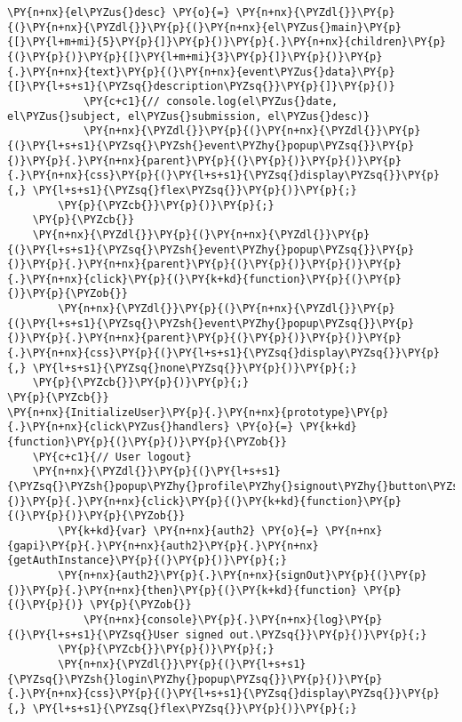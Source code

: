 \begin{Verbatim}[commandchars=\\\{\}]
            \PY{n+nx}{el\PYZus{}desc} \PY{o}{=} \PY{n+nx}{\PYZdl{}}\PY{p}{(}\PY{n+nx}{\PYZdl{}}\PY{p}{(}\PY{n+nx}{el\PYZus{}main}\PY{p}{[}\PY{l+m+mi}{5}\PY{p}{]}\PY{p}{)}\PY{p}{.}\PY{n+nx}{children}\PY{p}{(}\PY{p}{)}\PY{p}{[}\PY{l+m+mi}{3}\PY{p}{]}\PY{p}{)}\PY{p}{.}\PY{n+nx}{text}\PY{p}{(}\PY{n+nx}{event\PYZus{}data}\PY{p}{[}\PY{l+s+s1}{\PYZsq{}description\PYZsq{}}\PY{p}{]}\PY{p}{)}
            \PY{c+c1}{// console.log(el\PYZus{}date, el\PYZus{}subject, el\PYZus{}submission, el\PYZus{}desc)}
            \PY{n+nx}{\PYZdl{}}\PY{p}{(}\PY{n+nx}{\PYZdl{}}\PY{p}{(}\PY{l+s+s1}{\PYZsq{}\PYZsh{}event\PYZhy{}popup\PYZsq{}}\PY{p}{)}\PY{p}{.}\PY{n+nx}{parent}\PY{p}{(}\PY{p}{)}\PY{p}{)}\PY{p}{.}\PY{n+nx}{css}\PY{p}{(}\PY{l+s+s1}{\PYZsq{}display\PYZsq{}}\PY{p}{,} \PY{l+s+s1}{\PYZsq{}flex\PYZsq{}}\PY{p}{)}\PY{p}{;}
        \PY{p}{\PYZcb{}}\PY{p}{)}\PY{p}{;}
    \PY{p}{\PYZcb{}}
    \PY{n+nx}{\PYZdl{}}\PY{p}{(}\PY{n+nx}{\PYZdl{}}\PY{p}{(}\PY{l+s+s1}{\PYZsq{}\PYZsh{}event\PYZhy{}popup\PYZsq{}}\PY{p}{)}\PY{p}{.}\PY{n+nx}{parent}\PY{p}{(}\PY{p}{)}\PY{p}{)}\PY{p}{.}\PY{n+nx}{click}\PY{p}{(}\PY{k+kd}{function}\PY{p}{(}\PY{p}{)}\PY{p}{\PYZob{}}
        \PY{n+nx}{\PYZdl{}}\PY{p}{(}\PY{n+nx}{\PYZdl{}}\PY{p}{(}\PY{l+s+s1}{\PYZsq{}\PYZsh{}event\PYZhy{}popup\PYZsq{}}\PY{p}{)}\PY{p}{.}\PY{n+nx}{parent}\PY{p}{(}\PY{p}{)}\PY{p}{)}\PY{p}{.}\PY{n+nx}{css}\PY{p}{(}\PY{l+s+s1}{\PYZsq{}display\PYZsq{}}\PY{p}{,} \PY{l+s+s1}{\PYZsq{}none\PYZsq{}}\PY{p}{)}\PY{p}{;}
    \PY{p}{\PYZcb{}}\PY{p}{)}\PY{p}{;}
\PY{p}{\PYZcb{}}
\PY{n+nx}{InitializeUser}\PY{p}{.}\PY{n+nx}{prototype}\PY{p}{.}\PY{n+nx}{click\PYZus{}handlers} \PY{o}{=} \PY{k+kd}{function}\PY{p}{(}\PY{p}{)}\PY{p}{\PYZob{}}
    \PY{c+c1}{// User logout}
    \PY{n+nx}{\PYZdl{}}\PY{p}{(}\PY{l+s+s1}{\PYZsq{}\PYZsh{}popup\PYZhy{}profile\PYZhy{}signout\PYZhy{}button\PYZsq{}}\PY{p}{)}\PY{p}{.}\PY{n+nx}{click}\PY{p}{(}\PY{k+kd}{function}\PY{p}{(}\PY{p}{)}\PY{p}{\PYZob{}}
        \PY{k+kd}{var} \PY{n+nx}{auth2} \PY{o}{=} \PY{n+nx}{gapi}\PY{p}{.}\PY{n+nx}{auth2}\PY{p}{.}\PY{n+nx}{getAuthInstance}\PY{p}{(}\PY{p}{)}\PY{p}{;}
        \PY{n+nx}{auth2}\PY{p}{.}\PY{n+nx}{signOut}\PY{p}{(}\PY{p}{)}\PY{p}{.}\PY{n+nx}{then}\PY{p}{(}\PY{k+kd}{function} \PY{p}{(}\PY{p}{)} \PY{p}{\PYZob{}}
            \PY{n+nx}{console}\PY{p}{.}\PY{n+nx}{log}\PY{p}{(}\PY{l+s+s1}{\PYZsq{}User signed out.\PYZsq{}}\PY{p}{)}\PY{p}{;}
        \PY{p}{\PYZcb{}}\PY{p}{)}\PY{p}{;}
        \PY{n+nx}{\PYZdl{}}\PY{p}{(}\PY{l+s+s1}{\PYZsq{}\PYZsh{}login\PYZhy{}popup\PYZsq{}}\PY{p}{)}\PY{p}{.}\PY{n+nx}{css}\PY{p}{(}\PY{l+s+s1}{\PYZsq{}display\PYZsq{}}\PY{p}{,} \PY{l+s+s1}{\PYZsq{}flex\PYZsq{}}\PY{p}{)}\PY{p}{;}

\end{Verbatim}
